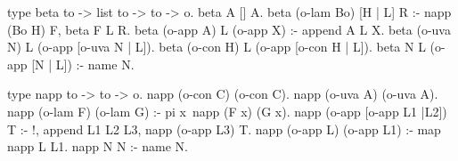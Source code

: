 \begin{elpicode}
  type beta to -> list to -> to -> o.
  beta A [] A.
  beta (o-lam Bo) [H | L] R :- napp (Bo H) F, beta F L R.
  beta (o-app A) L (o-app X) :- append A L X.
  beta (o-uva N) L (o-app [o-uva N | L]).
  beta (o-con H) L (o-app [o-con H | L]).
  beta N L (o-app [N | L]) :- name N.

  type napp to -> to -> o.
  napp (o-con C) (o-con C).
  napp (o-uva A) (o-uva A).
  napp (o-lam F) (o-lam G) :- pi x\ napp (F x) (G x).
  napp (o-app [o-app L1 |L2]) T :- !,
    append L1 L2 L3, napp (o-app L3) T.
  napp (o-app L) (o-app L1) :- map napp L L1.
  napp N N :- name N.
\end{elpicode}
